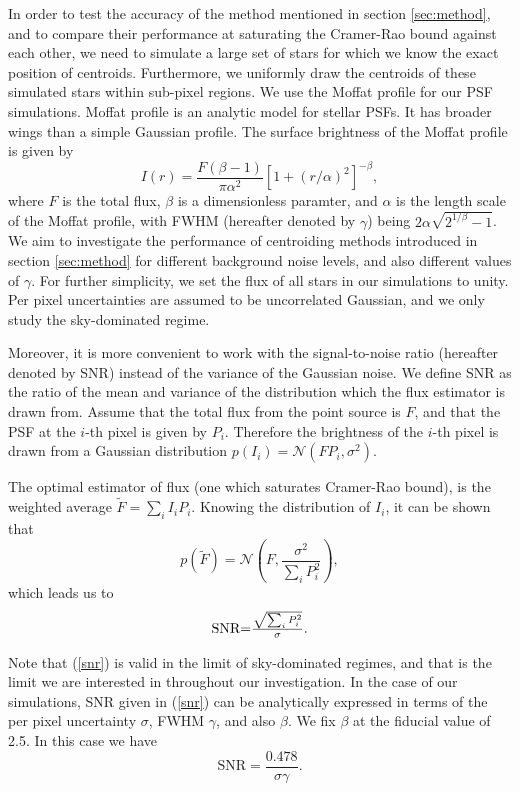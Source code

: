 \documentclass[12pt, preprint]{aastex}
\newcommand{\beq}{\begin{equation}}
\newcommand{\eeq}{\end{equation}}
\begin{document}
In order to test the accuracy of the method mentioned in section \ref{sec:method},
 and to compare their performance at saturating the Cramer-Rao bound against each other, 
we need to simulate a large set of stars for which we know the exact position of centroids.
Furthermore, we uniformly draw the centroids of these simulated stars within sub-pixel regions. 
We use the Moffat profile \citep{moffat} for our PSF simulations. 
Moffat profile is an analytic model for stellar PSFs. It has broader wings than
a simple Gaussian profile. The surface brightness of the Moffat profile is given by
\beq
I(r) = \frac{F(\beta -1)}{\pi \alpha^{2}}[1+(r/\alpha)^{2}]^{-\beta},
\label{mof}
\eeq
where $F$ is the total flux, $\beta$ is a dimensionless paramter, and $\alpha$ is
the length scale of the Moffat profile, with FWHM (hereafter denoted by $\gamma$)
being $2\alpha\sqrt{2^{1/\beta}-1}$. 
We aim to investigate the performance of centroiding methods introduced
in section \ref{sec:method} for different background noise levels, and also different
values of $\gamma$. For further simplicity, we set the flux of all stars in our
simulations to unity. Per pixel uncertainties are assumed to be uncorrelated Gaussian,
and we only study the sky-dominated regime.

Moreover, it is more convenient to work with the signal-to-noise ratio
(hereafter denoted by SNR) instead of the variance of the Gaussian noise.
We define SNR as the ratio of the mean and variance of the distribution
which the flux estimator is drawn from. Assume that the total flux from
the point source is $F$, and that the PSF at the $i$-th pixel is given
by $P_{i}$. Therefore the brightness of the $i$-th pixel is drawn from
a Gaussian distribution $p(I_{i}) = \mathcal{N}(FP_{i},\sigma^{2})$. 

The optimal estimator of flux (one which saturates Cramer-Rao bound),
is the weighted average $\tilde{F}=\sum_{i}I_{i}P_{i}$. Knowing the
distribution of $I_{i}$, it can be shown that 
\beq
p(\tilde{F}) = \mathcal{N}(F , \frac{\sigma^{2}}{\sum_{i}P_{i}^{2}}),
\eeq  
which leads us to
\beq
\begin{array}{l}
\text{SNR} $=$ \frac{\sqrt{\sum_{i} P_{i}^{2}}}{\sigma}.
\end{array}
\label{snr}
\eeq

Note that (\ref{snr}) is valid in the limit of sky-dominated regimes,
and that is the limit we are interested in throughout our investigation.
 In the case of our simulations, SNR given in (\ref{snr}) can be analytically
 expressed in terms of the per pixel uncertainty
$\sigma$, FWHM $\gamma$, and also $\beta$. We fix $\beta$ at the fiducial value of 2.5.
In this case we have
\beq
\text{SNR} = \frac{0.478}{\sigma \gamma}.
\label{snr2}
\eeq
\end{document}
